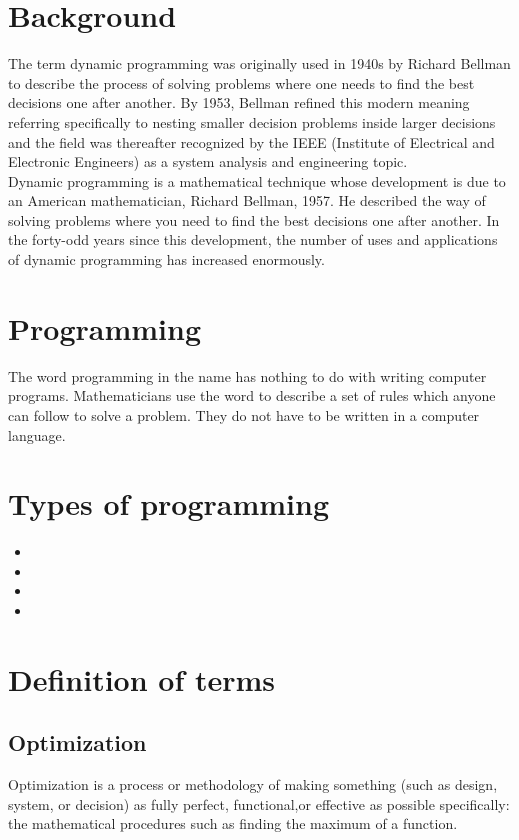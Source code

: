 \documentclass[12pt]{report}
\begin{document}
	\section{Background}
	The term dynamic programming was originally used in 1940s by Richard Bellman to describe the process of solving problems where one needs to find the best decisions one after another. By 1953, Bellman refined this modern meaning referring specifically to nesting smaller decision problems inside larger decisions and the field was thereafter recognized by the IEEE (Institute of Electrical and Electronic Engineers) as a system analysis and engineering topic.\\
	Dynamic programming is a mathematical technique whose development is due to an American mathematician, Richard Bellman, 1957. He described the way of solving problems where you need to find the best decisions one after another. In the forty-odd years since this development, the number of uses and applications of dynamic programming has increased enormously.\\
	\section{Programming}
	The word programming in the name has nothing to do with writing computer programs. Mathematicians use the word to describe a set of rules which anyone can follow to solve a problem. They do not have to be written in a computer language.
	\section{Types of programming}
	\begin{itemize}
		\begin{itemize}
			\item
			\item
			\item
			\item
		\end{itemize}
	\end{itemize}
	
	\section{Definition of terms}
	\flushleft
	\subsection{Optimization}
	Optimization is a process or methodology of making something (such as design, system, or decision) as fully perfect, functional,or effective as possible specifically: the mathematical procedures such as finding the maximum of a function.\\
	\flushleft
\end{document}

